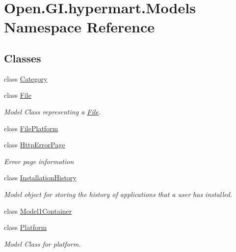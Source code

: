 \hypertarget{namespace_open_1_1_g_i_1_1hypermart_1_1_models}{}\section{Open.\+G\+I.\+hypermart.\+Models Namespace Reference}
\label{namespace_open_1_1_g_i_1_1hypermart_1_1_models}
\subsection*{Classes}
\begin{DoxyCompactItemize}
\item 
class \hyperlink{class_open_1_1_g_i_1_1hypermart_1_1_models_1_1_category}{Category}
\item 
class \hyperlink{class_open_1_1_g_i_1_1hypermart_1_1_models_1_1_file}{File}
\begin{DoxyCompactList}\small\item\em Model Class representing a \hyperlink{class_open_1_1_g_i_1_1hypermart_1_1_models_1_1_file}{File}. \end{DoxyCompactList}\item 
class \hyperlink{class_open_1_1_g_i_1_1hypermart_1_1_models_1_1_file_platform}{File\+Platform}
\item 
class \hyperlink{class_open_1_1_g_i_1_1hypermart_1_1_models_1_1_http_error_page}{Http\+Error\+Page}
\begin{DoxyCompactList}\small\item\em Error page information \end{DoxyCompactList}\item 
class \hyperlink{class_open_1_1_g_i_1_1hypermart_1_1_models_1_1_installation_history}{Installation\+History}
\begin{DoxyCompactList}\small\item\em Model object for storing the history of applications that a user has installed. \end{DoxyCompactList}\item 
class \hyperlink{class_open_1_1_g_i_1_1hypermart_1_1_models_1_1_model1_container}{Model1\+Container}
\item 
class \hyperlink{class_open_1_1_g_i_1_1hypermart_1_1_models_1_1_platform}{Platform}
\begin{DoxyCompactList}\small\item\em Model Class for platform. \end{DoxyCompactList}\item 

\end{DoxyCompactItemize}

